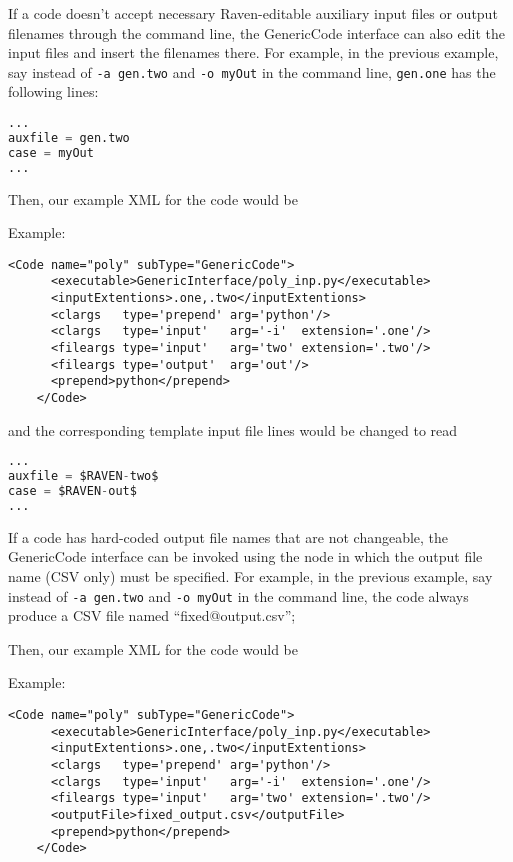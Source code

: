 If a code doesn't accept necessary Raven-editable auxiliary input files
or output filenames through the command line, the GenericCode interface
can also edit the input files and insert the filenames there.  For example,
in the previous example, say instead of \texttt{-a gen.two} and \texttt{-o myOut}
in the command line, \texttt{gen.one} has the following lines:
\begin{lstlisting}[language=python]
...
auxfile = gen.two
case = myOut
...
\end{lstlisting}
Then, our example XML for the code would be

Example:
\begin{lstlisting}[style=XML]
    <Code name="poly" subType="GenericCode">
      <executable>GenericInterface/poly_inp.py</executable>
      <inputExtentions>.one,.two</inputExtentions>
      <clargs   type='prepend' arg='python'/>
      <clargs   type='input'   arg='-i'  extension='.one'/>
      <fileargs type='input'   arg='two' extension='.two'/>
      <fileargs type='output'  arg='out'/>
      <prepend>python</prepend>
    </Code>
\end{lstlisting}
and the corresponding template input file lines would be changed to read
\begin{lstlisting}[language=python]
...
auxfile = $RAVEN-two$
case = $RAVEN-out$
...
\end{lstlisting}



If a code has hard-coded output file names that are not changeable,
the GenericCode interface can be invoked using the 
node in which the output file name (CSV only) must be specified.
For example, in the previous example, say instead of \texttt{-a gen.two} and \texttt{-o myOut}
in the command line, the code always produce a CSV file named ``fixed@output.csv'';

Then, our example XML for the code would be

Example:
\begin{lstlisting}[style=XML]
    <Code name="poly" subType="GenericCode">
      <executable>GenericInterface/poly_inp.py</executable>
      <inputExtentions>.one,.two</inputExtentions>
      <clargs   type='prepend' arg='python'/>
      <clargs   type='input'   arg='-i'  extension='.one'/>
      <fileargs type='input'   arg='two' extension='.two'/>
      <outputFile>fixed_output.csv</outputFile>
      <prepend>python</prepend>
    </Code>
\end{lstlisting}


